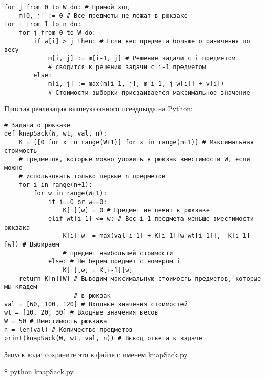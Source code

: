 \vspace{\baselineskip}
\begin{tcolorbox}
\begin{verbatim}
for j from 0 to W do: # Прямой ход    
	m[0, j] := 0 # Все предметы не лежат в рюкзаке
for i from 1 to n do:    
	for j from 0 to W do:        
		if w[i] > j then: # Если вес предмета больше ограничения по весу           
			m[i, j] := m[i-1, j] # Решение задачи с i предметом 
			# сводится к решению задачи с i-1 предметом        
		else:            
			m[i, j] := max(m[i-1, j], m[i-1, j-w[i]] + v[i]) 
			# Стоимости выборки присваивается максимальное значение
\end{verbatim}
\end{tcolorbox}

\vspace{\baselineskip}
Простая реализация вышеуказанного псевдокода на Python:

\vspace{\baselineskip}
\begin{tcolorbox}
\begin{verbatim}
# Задача о рюкзаке
def knapSack(W, wt, val, n):    
	K = [[0 for x in range(W+1)] for x in range(n+1)] # Максимальная стоимость 
	# предметов, которые можно уложить в рюкзак вместимости W, если можно 
	# использовать только первые n предметов  
	for i in range(n+1):        
		for w in range(W+1):            
			if i==0 or w==0:                
				K[i][w] = 0 # Предмет не лежит в рюкзаке            
			elif wt[i-1] <= w: # Вес i-1 предмета меньше вместимости рюкзака                
				K[i][w] = max(val[i-1] + K[i-1][w-wt[i-1]],  K[i-1][w]) # Выбираем 
			    # предмет наибольшей стоимости    
			else: # Не берем предмет с номером i                
				K[i][w] = K[i-1][w]    
	return K[n][W] # Выводим максимальную стоимость предметов, которые мы кладем 
	               # в рюкзак
val = [60, 100, 120] # Входные значения стоимостей
wt = [10, 20, 30] # Входные значения весов
W = 50 # Вместимость рюкзака
n = len(val) # Количество предметов
print(knapSack(W, wt, val, n)) # Вывод ответа к задаче
\end{verbatim}
\end{tcolorbox}

\vspace{\baselineskip}
Запуск кода: сохраните это в файле с именем knapSack.py

\vspace{\baselineskip}
\begin{tcolorbox}
\$ python knapSack.py

\end{tcolorbox}

